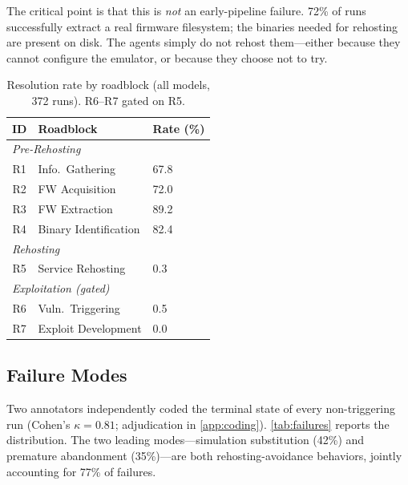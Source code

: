 The critical point is that this is \emph{not} an early-pipeline failure. 72\% of runs successfully extract a real firmware filesystem; the binaries needed for rehosting are present on disk. The agents simply do not rehost them---either because they cannot configure the emulator, or because they choose not to try.

\begin{table}[t]
    \centering
    \caption{Resolution rate by roadblock (all models, 372 runs). R6--R7 gated on R5.}
    \label{tab:roadblock_rates}
    \small
    \begin{tabular}{cll}
        \toprule
        \textbf{ID} & \textbf{Roadblock} & \textbf{Rate (\%)} \\
        \midrule
        \multicolumn{3}{l}{\emph{Pre-Rehosting}} \\
        R1 & Info.\ Gathering     & 67.8 \\
        R2 & FW Acquisition       & 72.0 \\
        R3 & FW Extraction        & 89.2 \\
        R4 & Binary Identification& 82.4 \\
        \midrule
        \multicolumn{3}{l}{\emph{Rehosting}} \\
        R5 & Service Rehosting    & 0.3  \\
        \midrule
        \multicolumn{3}{l}{\emph{Exploitation (gated)}} \\
        R6 & Vuln.\ Triggering    & 0.5  \\
        R7 & Exploit Development  & 0.0  \\
        \bottomrule
    \end{tabular}
\end{table}

\subsection{Failure Modes}
\label{sec:failures}

Two annotators independently coded the terminal state of every non-triggering run (Cohen's $\kappa=0.81$; adjudication in \cref{app:coding}). \cref{tab:failures} reports the distribution. The two leading modes---simulation substitution (42\%) and premature abandonment (35\%)---are both rehosting-avoidance behaviors, jointly accounting for 77\% of failures.

